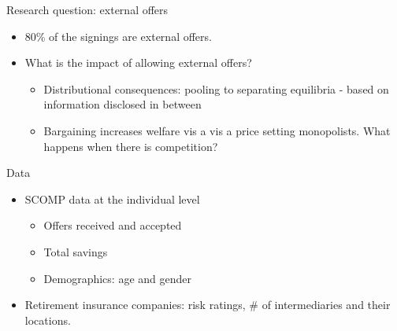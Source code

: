 \documentclass[10pt,aspectratio=169]{beamer}
\begin{document}
\begin{frame}{Research question: external offers}

\begin{itemize}
   
    \item 80\% of the signings are external offers. 
    \item What is the impact of allowing external offers? 

    \begin{itemize}
        \item Distributional consequences: pooling to separating equilibria - based on information disclosed in between


        \item Bargaining increases welfare vis a vis a price setting monopolists. What happens when there is competition? 
\end{itemize}   
\end{itemize}
\end{frame}




 \begin{frame}{Data}
\begin{itemize}
    \item SCOMP data at the individual level  
    \begin{itemize}
        \item Offers received and accepted 
        \item Total savings 
        \item Demographics: age and gender
    \end{itemize}
     \item Retirement insurance companies: risk ratings, \#  of intermediaries and their  locations.
\end{itemize}
\end{frame}
 
\end{document}
